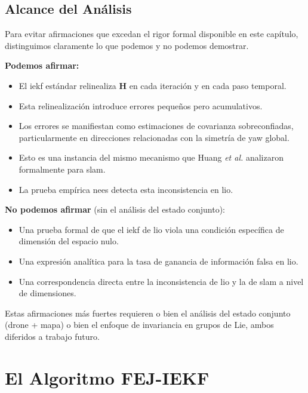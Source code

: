 \subsection{Alcance del Análisis}
\label{sec:fej-alcance}

Para evitar afirmaciones que excedan el rigor formal disponible en este
capítulo, distinguimos claramente lo que podemos y no podemos demostrar.

\textbf{Podemos afirmar:}

\begin{itemize}
    \item El \gls{iekf} estándar relinealiza $\mathbf{H}$ en cada iteración y
    en cada paso temporal.
    \item Esta relinealización introduce errores pequeños pero acumulativos.
    \item Los errores se manifiestan como estimaciones de covarianza
    sobreconfiadas, particularmente en direcciones relacionadas con la simetría
    de yaw global.
    \item Esto es una instancia del mismo mecanismo que Huang \emph{et al.}
    analizaron formalmente para \gls{slam}.
    \item La prueba empírica \gls{nees} detecta esta inconsistencia en \gls{lio}.
\end{itemize}

\textbf{No podemos afirmar} (sin el análisis del estado conjunto):

\begin{itemize}
    \item Una prueba formal de que el \gls{iekf} de \gls{lio} viola una
    condición específica de dimensión del espacio nulo.
    \item Una expresión analítica para la tasa de ganancia de información falsa
    en \gls{lio}.
    \item Una correspondencia directa entre la inconsistencia de \gls{lio} y la
    de \gls{slam} a nivel de dimensiones.
\end{itemize}

Estas afirmaciones más fuertes requieren o bien el análisis del estado conjunto
(drone + mapa) o bien el enfoque de invariancia en grupos de Lie, ambos
diferidos a trabajo futuro.

\section{El Algoritmo FEJ-IEKF}
\label{sec:fej-algoritmo}


